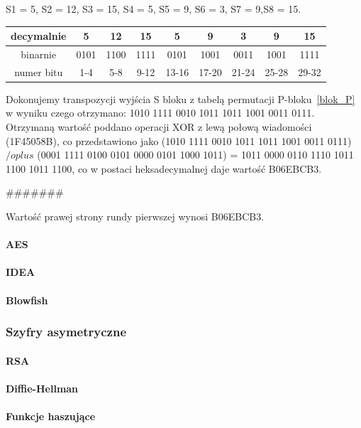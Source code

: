 \documentclass[12p]{article}
\begin{document}
S1 = 5, S2 = 12, S3 = 15, S4 = 5, S5 = 9, S6 = 3, S7 = 9,S8 = 15.

\begin{table}[!h]
\centering
\begin{tabular}{|c|c|c|c|c|c|c|c|c|} 
\hline
decymalnie &5 &12& 15& 5& 9& 3& 9& 15\\ \hline
binarnie & 0101& 1100& 1111& 0101& 1001& 0011& 1001& 1111\\ \hline
numer bitu &1-4 &5-8& 9-12& 13-16& 17-20& 21-24& 25-28& 29-32\\ \hline
\end{tabular}
\end{table}



Dokonujemy transpozycji wyjścia S bloku z tabelą permutacji P-bloku~\ref{blok_P} w wyniku czego otrzymano: 1010 1111 0010 1011 1011 1001 0011 0111. Otrzymaną wartość poddano operacji XOR z lewą połową wiadomości (1F45058B), co przedstawiono jako (1010 1111 0010 1011 1011 1001 0011 0111) $/oplus$ (0001 1111 0100 0101 0000 0101 1000 1011) = 1011 0000 0110 1110 1011 1100 1011 1100, co w postaci heksadecymalnej daje wartość B06EBCB3.

#######

Wartość prawej strony rundy pierwszej wynosi B06EBCB3. 


\paragraph{AES}
\paragraph{IDEA}
\paragraph{Blowfish}


\subsubsection{Szyfry asymetryczne}
\paragraph{RSA}
\paragraph{Diffie-Hellman}
\paragraph{Funkcje haszujące}
\end{document}

